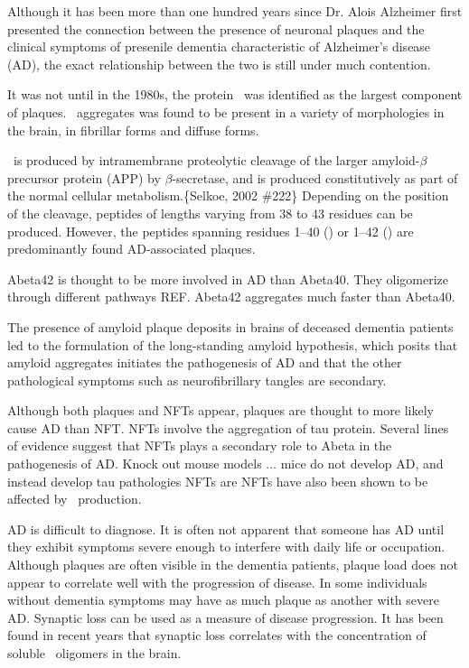 Although it has been more than one hundred years since Dr. Alois Alzheimer  first presented the connection between the presence of neuronal plaques and the clinical symptoms of presenile dementia characteristic of Alzheimer's disease (AD), the exact relationship between the two is still under much contention.

It was not until in the 1980s, the protein \abeta\ was identified as the largest component of plaques. \abeta\ aggregates was found to be present in a variety of morphologies in the brain, in fibrillar forms and diffuse forms.

\abeta\ is produced by intramembrane proteolytic cleavage of the larger amyloid-$\beta$ precursor protein (APP) by $\beta$-secretase, and is produced constitutively as part of the normal cellular metabolism.\{Selkoe, 2002 \#222\} Depending on the position of the cleavage, \abeta peptides of lengths varying from 38 to 43 residues can be produced. However, the peptides spanning residues 1--40 () or 1--42 () are predominantly found AD-associated plaques.

Abeta42 is thought to be more involved in AD than Abeta40.  They oligomerize through different pathways REF. Abeta42 aggregates much faster than Abeta40. 


The presence of amyloid plaque deposits in brains of deceased dementia patients led to the formulation of the long-standing amyloid hypothesis, which posits that amyloid aggregates initiates the pathogenesis of AD and that the other pathological symptoms such as neurofibrillary tangles are secondary.

Although both plaques and NFTs appear, plaques are thought to more likely cause AD than NFT. NFTs involve the aggregation of tau protein.  Several lines of evidence suggest that NFTs plays a secondary role to Abeta in the pathogenesis of AD. Knock out mouse models ... mice do not develop AD, and instead develop tau pathologies NFTs are NFTs have also been shown to be affected by \abeta\ production.

AD is difficult to diagnose.  It is often not apparent that someone has AD until they exhibit symptoms severe enough to interfere with daily life or occupation. Although plaques are often visible in the dementia patients, plaque load does not appear to correlate well with the progression of disease.  In some individuals without dementia symptoms may have as much plaque as another with severe AD. Synaptic loss can be used as a measure of disease progression. It has been found in recent years that synaptic loss correlates with the concentration of soluble \abeta\ oligomers in the brain.


